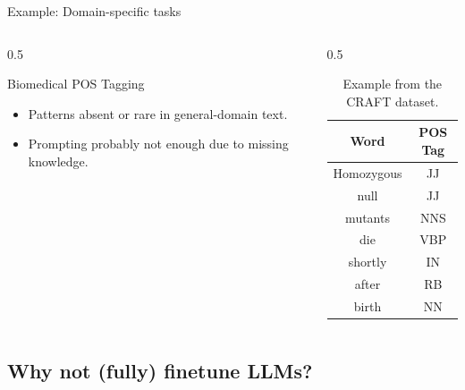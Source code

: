 \documentclass[24pt]{beamer}
\begin{document}
\begin{frame}{Example: Domain-specific tasks}
    \begin{columns}
        \begin{column}{0.5\textwidth}
            \begin{block}{Biomedical POS Tagging}
                \begin{itemize}
                    \item Patterns absent or rare in general-domain text.
                    \item Prompting probably not enough due to
                    \alert{missing knowledge}.
                \end{itemize}
            \end{block}
        \end{column}

        \begin{column}{0.5\textwidth}
            \begin{table}[h]
                \centering
                \begin{tabular}{cc}
                    \toprule \textbf{Word} & \textbf{POS Tag} \\
                    \midrule Homozygous & JJ \\
                    null & JJ \\
                    mutants & NNS \\
                    die & VBP \\
                    shortly & IN \\
                    after & RB \\
                    birth & NN \\
                    \bottomrule
                \end{tabular}
                \caption{Example from the CRAFT dataset.}
            \end{table}
        \end{column}
    \end{columns}
\end{frame}


\subsection{Why not (fully) finetune LLMs?}

\begin{frame}
	\sectionpage
	\subsectionpage
\end{frame}
\end{document}
